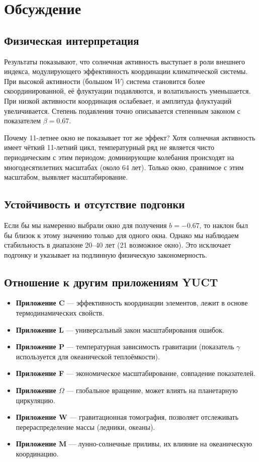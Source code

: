 \documentclass[12pt,a4paper]{article}
\newcommand{\be}{\beta}
\newcommand{\ga}{\gamma}
\begin{document}
	\section{Обсуждение}
	
	\subsection{Физическая интерпретация}
	
	Результаты показывают, что солнечная активность выступает в роли внешнего индекса, модулирующего эффективность координации климатической системы. При высокой активности (большом \(W\)) система становится более скоординированной, её флуктуации подавляются, и волатильность уменьшается. При низкой активности координация ослабевает, и амплитуда флуктуаций увеличивается. Степень подавления точно описывается степенным законом с показателем \(\be = 0.67\).
	
	Почему 11-летнее окно не показывает тот же эффект? Хотя солнечная активность имеет чёткий 11-летний цикл, температурный ряд не является чисто периодическим с этим периодом; доминирующие колебания происходят на многодесятилетних масштабах (около 64 лет). Только окно, сравнимое с этим масштабом, выявляет масштабирование.
	
	\subsection{Устойчивость и отсутствие подгонки}
	
	Если бы мы намеренно выбрали окно для получения \(b = -0.67\), то наклон был бы близок к этому значению только для одного окна. Однако мы наблюдаем стабильность в диапазоне 20–40 лет (21 возможное окно). Это исключает подгонку и указывает на подлинную физическую закономерность.
	
	\subsection{Отношение к другим приложениям YUCT}
	
	\begin{itemize}
		\item \textbf{Приложение C} — эффективность координации элементов, лежит в основе термодинамических свойств.
		\item \textbf{Приложение L} — универсальный закон масштабирования ошибок.
		\item \textbf{Приложение P} — температурная зависимость гравитации (показатель \(\ga\) используется для океанической теплоёмкости).
		\item \textbf{Приложение F} — экономическое масштабирование, совпадение показателей.
		\item \textbf{Приложение \(\Omega\)} — глобальное вращение, может влиять на планетарную циркуляцию.
		\item \textbf{Приложение W} — гравитационная томография, позволяет отслеживать перераспределение массы (ледники, океаны).
		\item \textbf{Приложение M} — лунно-солнечные приливы, их влияние на океаническую координацию.
	\end{itemize}
	
\end{document}

